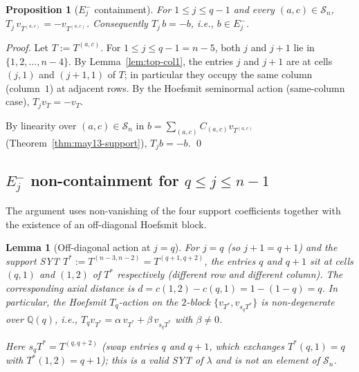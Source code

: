 \documentclass[11pt]{article}
\newtheorem{lemma}[theorem]{Lemma}
\newtheorem{proposition}[theorem]{Proposition}
\theoremstyle{definition}
\begin{document}
\begin{proposition}[$E_j^-$ containment]\label{prop:Ej-minus}
For $1 \le j \le q - 1$ and every $(a, c) \in \mathcal{S}_n$,
$T_j\,v_{T^{(a,c)}} = -v_{T^{(a,c)}}$.  Consequently
$T_j\,b = -b$, i.e., $b \in E_j^-$.
\end{proposition}

\begin{proof}
Let $T := T^{(a,c)}$.  For $1 \le j \le q-1 = n-5$, both $j$ and $j+1$
lie in $\{1, 2, \ldots, n-4\}$.  By Lemma~\ref{lem:top-col1}, the
entries $j$ and $j+1$ are at cells $(j, 1)$ and $(j+1, 1)$ of $T$;
in particular they occupy the same column (column~$1$) at adjacent
rows.  By the Hoefsmit seminormal action (same-column case),
$T_j v_T = -v_T$.

By linearity over $(a, c) \in \mathcal{S}_n$ in
$b = \sum_{(a,c)} C_{(a,c)} v_{T^{(a,c)}}$ (Theorem~\ref{thm:may13-support}),
$T_j b = -b$.
\qed
\end{proof}

\subsection{$E_j^-$ non-containment for $q \le j \le n-1$}

The argument uses non-vanishing of the four support coefficients
together with the existence of an off-diagonal Hoefsmit block.

\begin{lemma}[Off-diagonal action at $j = q$]\label{lem:j=q-offdiag}
For $j = q$ (so $j + 1 = q + 1$) and the support SYT
$T^* := T^{(n-3, n-2)} = T^{(q+1, q+2)}$, the entries $q$ and $q+1$
sit at cells $(q, 1)$ and $(1, 2)$ of $T^*$ respectively (different
row and different column).  The corresponding axial distance is
$d = c(1,2) - c(q,1) = 1 - (1-q) = q$.  In particular, the
Hoefsmit $T_q$-action on the $2$-block
$\{v_{T^*}, v_{s_q T^*}\}$ is non-degenerate over $\mathbb{Q}(q)$,
i.e., $T_q v_{T^*} = \alpha\,v_{T^*} + \beta\,v_{s_q T^*}$
with $\beta \ne 0$.

Here $s_q T^* = T^{(q, q+2)}$ (swap entries $q$ and $q+1$, which
exchanges $T^*(q,1) = q$ with $T^*(1,2) = q+1$); this is a valid
SYT of $\lambda$ and is \emph{not} an element of $\mathcal{S}_n$.
\end{lemma}
\end{document}
